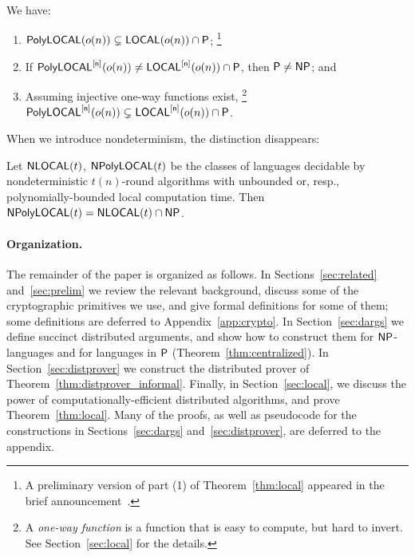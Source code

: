 \begin{theorem}\label{theo:local}
	We have:
	\begin{enumerate}
		\item $\mathsf{PolyLOCAL}(o(n)) \subsetneq {\mathsf{LOCAL}}(o(n)) \cap {\mathsf{P}}$;%
			\footnote{
A preliminary version of part (1) of Theorem~\ref{thm:local} 
appeared in the brief announcement~\cite{BA}.}
		\item If $\mathsf{PolyLOCAL}^{[\mathsf{n}]}(o(n)) \neq {\mathsf{LOCAL}}^{[\mathsf{n}]}(o(n)) \cap {\mathsf{P}}$, then ${\mathsf{P}} \neq {\mathsf{NP}}$; and
		\item Assuming injective one-way functions exist,%
			\footnote{A \emph{one-way function}
			is a function that is easy to compute, but hard to invert.
			See Section~\ref{sec:local} for the details.}
			$\mathsf{PolyLOCAL}^{[\mathsf{n}]}(o(n)) \subsetneq {\mathsf{LOCAL}}^{[\mathsf{n}]}(o(n)) \cap {\mathsf{P}}$.
	\end{enumerate}
	\label{thm:local}
\end{theorem}

When we introduce nondeterminism,
the distinction disappears:
\begin{theorem}\label{theo:NLD}
	Let ${\mathsf{NLOCAL}}(t)$, $\mathsf{NPolyLOCAL}(t)$ be the classes of languages decidable by 
	nondeterministic $t(n)$-round algorithms with unbounded or, resp., polynomially-bounded
	local computation time.
	Then $\mathsf{NPolyLOCAL}(t) = {\mathsf{NLOCAL}}(t) \cap {\mathsf{NP}}$.
	\label{thm:nlocal}
\end{theorem}



\paragraph{Organization.}
The remainder of the paper is organized as follows.
In Sections~\ref{sec:related} and~\ref{sec:prelim}
we review the relevant background, discuss some of the cryptographic primitives we use,
and give formal definitions for some of them;
some definitions are deferred to Appendix~\ref{app:crypto}. %
In Section~\ref{sec:dargs} we define succinct distributed arguments, and 
show how to construct them for ${\mathsf{NP}}$-languages and for languages in ${\mathsf{P}}$
(Theorem~\ref{thm:centralized}).
In Section~\ref{sec:distprover} we construct the distributed prover of Theorem~\ref{thm:distprover_informal}.
Finally, in Section~\ref{sec:local},
we discuss the power of computationally-efficient distributed algorithms,
and prove Theorem~\ref{thm:local}.
Many of the proofs, as well as pseudocode for the constructions in Sections~\ref{sec:dargs}
and~\ref{sec:distprover}, are deferred to the appendix.


